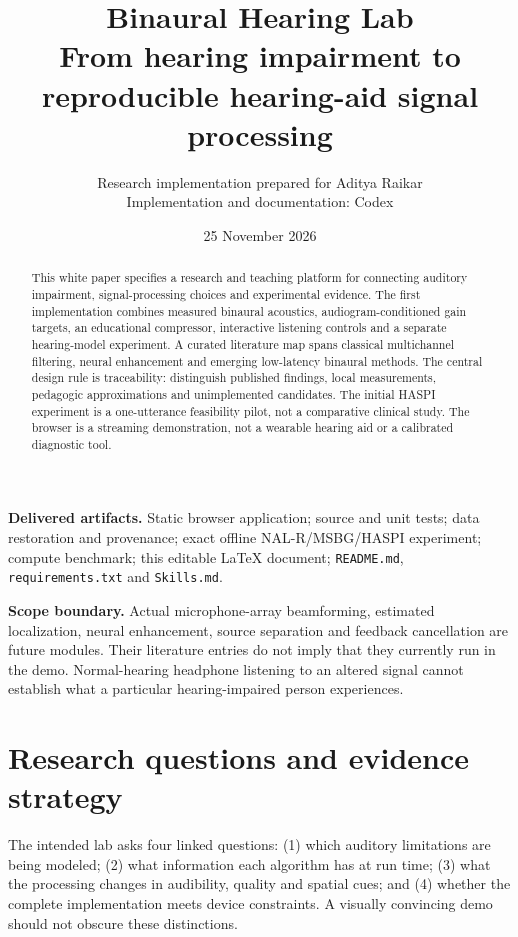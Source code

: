 \documentclass[11pt,a4paper]{article}
\title{\Huge Binaural Hearing Lab\\[8mm]\Large From hearing impairment to reproducible hearing-aid signal processing}
\author{Research implementation prepared for Aditya Raikar\\Implementation and documentation: Codex}
\date{25 November 2026}
\newcommand{\code}[1]{\texttt{#1}}
\begin{document}
\maketitle
\begin{abstract}
This white paper specifies a research and teaching platform for connecting auditory impairment, signal-processing choices and experimental evidence. The first implementation combines measured binaural acoustics, audiogram-conditioned gain targets, an educational compressor, interactive listening controls and a separate hearing-model experiment. A curated literature map spans classical multichannel filtering, neural enhancement and emerging low-latency binaural methods. The central design rule is traceability: distinguish published findings, local measurements, pedagogic approximations and unimplemented candidates. The initial HASPI experiment is a one-utterance feasibility pilot, not a comparative clinical study. The browser is a streaming demonstration, not a wearable hearing aid or a calibrated diagnostic tool.
\end{abstract}
\vspace{6mm}
\textbf{Delivered artifacts.} Static browser application; source and unit tests; data restoration and provenance; exact offline NAL-R/MSBG/HASPI experiment; compute benchmark; this editable \LaTeX{} document; \code{README.md}, \code{requirements.txt} and \code{Skills.md}.

\textbf{Scope boundary.} Actual microphone-array beamforming, estimated localization, neural enhancement, source separation and feedback cancellation are future modules. Their literature entries do not imply that they currently run in the demo. Normal-hearing headphone listening to an altered signal cannot establish what a particular hearing-impaired person experiences.
\newpage
\section{Research questions and evidence strategy}
The intended lab asks four linked questions: (1) which auditory limitations are being modeled; (2) what information each algorithm has at run time; (3) what the processing changes in audibility, quality and spatial cues; and (4) whether the complete implementation meets device constraints. A visually convincing demo should not obscure these distinctions.
\end{document}

